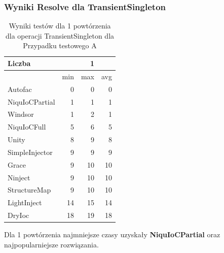 \documentclass[12pt]{article}
\begin{document}
\subsubsection{Wyniki Resolve dla TransientSingleton}
\begin{table}[H]
\captionsetup{belowskip=0pt,aboveskip=0pt}
\begin{center}
\begin{small}
	\begin{tabular}{ | l | r r r | }
    		\hline
Liczba & & 1 & \\ \hline
 & min & max & avg \\ \hline
Autofac & 0 & 0 & 0 \\ \hline
NiquIoCPartial & 1 & 1 & 1 \\ \hline
Windsor & 1 & 2 & 1 \\ \hline
NiquIoCFull & 5 & 6 & 5 \\ \hline
Unity & 8 & 9 & 8 \\ \hline
SimpleInjector & 9 & 9 & 9 \\ \hline
Grace & 9 & 10 & 10 \\ \hline
Ninject & 9 & 10 & 10 \\ \hline
StructureMap & 9 & 10 & 10 \\ \hline
LightInject & 14 & 15 & 14 \\ \hline
DryIoc & 18 & 19 & 18 \\ \hline
  	\end{tabular}
\end{small}
\end{center}
\caption{Wyniki testów dla 1 powtórzenia dla operacji TransientSingleton dla Przypadku testowego A}
\label{TestCaseA_TransientSingleton1}
\end{table}
Dla 1 powtórzenia najmniejsze czasy uzyskały \textbf{NiquIoCPartial} oraz najpopularniejsze rozwiązania.
\\ \\
\end{document}
